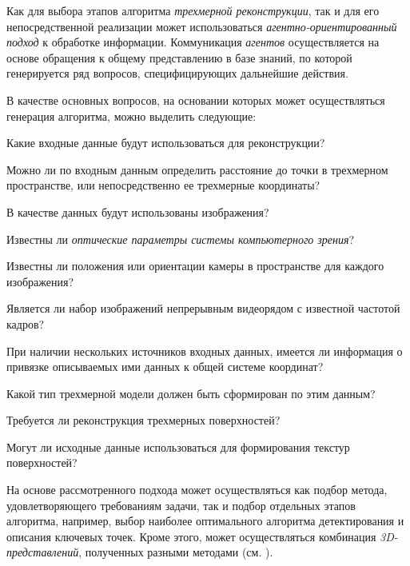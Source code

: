 Как для выбора этапов алгоритма \textit{трехмерной реконструкции}, так и для его непосредственной реализации может использоваться \textit{агентно-ориентированный подход} к обработке информации. Коммуникация \textit{агентов} осуществляется на основе обращения к общему представлению в базе знаний, по которой генерируется ряд вопросов, специфицирующих дальнейшие действия.

В качестве основных вопросов, на основании которых может осуществляться генерация алгоритма, можно выделить следующие:
\begin{textitemize}
    \item Какие входные данные будут использоваться для реконструкции?
    \begin{textitemize}
        \item Можно ли по входным данным определить расстояние до точки в трехмерном пространстве, или непосредственно ее трехмерные координаты?
        \item В качестве данных будут использованы изображения?
        \begin{textitemize}
            \item Известны ли \textit{оптические параметры системы компьютерного зрения}?
            \item Известны ли положения или ориентации камеры в пространстве для каждого изображения?
            \item Является ли набор изображений непрерывным видеорядом с известной частотой кадров?
        \end{textitemize}
        \item При наличии нескольких источников входных данных, имеется ли информация о привязке описываемых ими данных к общей системе координат?
    \end{textitemize}
    \item Какой тип трехмерной модели должен быть сформирован по этим данным?
    \begin{textitemize}
        \item Требуется ли реконструкция трехмерных поверхностей?
        \begin{textitemize}
            \item Могут ли исходные данные использоваться для формирования текстур поверхностей?
        \end{textitemize}
    \end{textitemize}
\end{textitemize}

На основе рассмотренного подхода может осуществляться как подбор метода, удовлетворяющего требованиям задачи, так и подбор отдельных этапов алгоритма, например, выбор наиболее оптимального алгоритма детектирования и описания ключевых точек.
Кроме этого, может осуществляться комбинация \textit{3D-представлений}, полученных разными методами (см. ).

